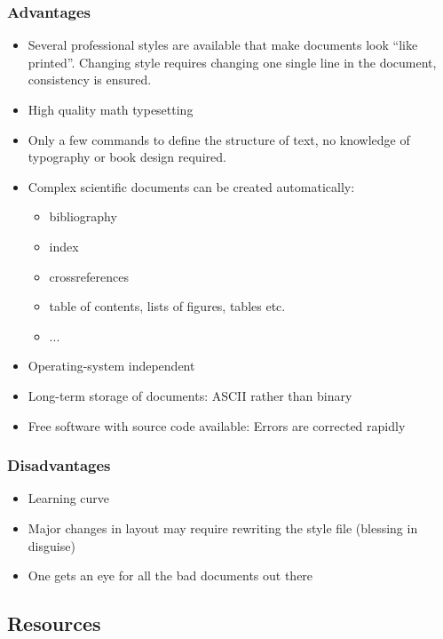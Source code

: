 \documentclass[presentation,hideothersubsections,final,10pt]{beamer}
\begin{document}
\begin{frame}
  \frametitle{Advantages}
  \begin{itemize}
     \item{Several professional styles are available that
         make documents look ``like printed''. Changing
         style requires changing one single line in the
         document, consistency is ensured.}
     \item{High quality math typesetting}
     \item{Only a few commands to define the structure of
         text, no knowledge of typography or book design
         required.}
     \item{Complex scientific documents can be created
         automatically:
         \begin{itemize}
           \item{bibliography}
           \item{index}
           \item{crossreferences}
           \item{table of contents, lists of figures,
               tables etc.}
           \item{...}
         \end{itemize} }
     \item{Operating-system independent}
     \item{Long-term storage of documents: ASCII rather
         than binary}
     \item{Free software with source code available: Errors
         are corrected rapidly}
  \end{itemize}
\end{frame}

\begin{frame}
  \frametitle{Disadvantages}
  \begin{itemize}
    \item{Learning curve}
    \item{Major changes in layout may require rewriting the
        style file (blessing in disguise)}
    \item{One gets an eye for all the bad documents out
        there}
  \end{itemize}
\end{frame}

\subsection{Resources}
\end{document}
